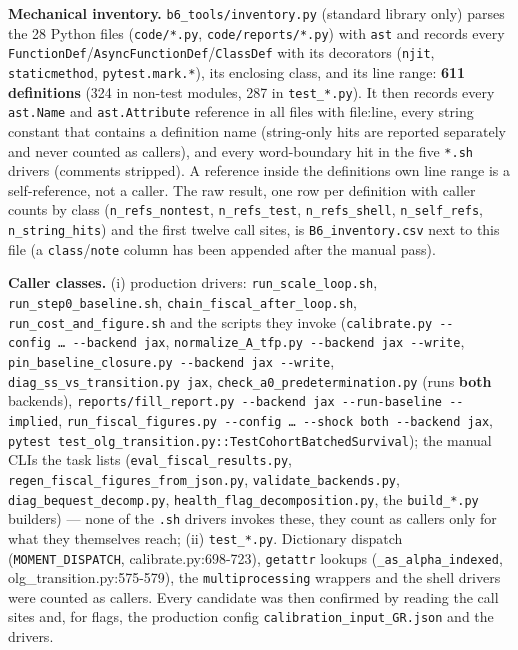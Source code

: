 

\textbf{Mechanical inventory.} \texttt{b6\_tools/inventory.py} (standard
library only) parses the 28 Python files (\texttt{code/*.py},
\texttt{code/reports/*.py}) with \texttt{ast} and records every
\texttt{FunctionDef}/\texttt{AsyncFunctionDef}/\texttt{ClassDef} with
its decorators (\texttt{njit}, \texttt{staticmethod},
\texttt{pytest.mark.*}), its enclosing class, and its line range:
\textbf{611 definitions} (324 in non-test modules, 287 in
\texttt{test\_*.py}). It then records every \texttt{ast.Name} and
\texttt{ast.Attribute} reference in all files with file:line, every
string constant that contains a definition name (string-only hits are
reported separately and never counted as callers), and every
word-boundary hit in the five \texttt{*.sh} drivers (comments stripped).
A reference inside the definition\textquotesingle s own line range is a
self-reference, not a caller. The raw result, one row per definition
with caller counts by class (\texttt{n\_refs\_nontest},
\texttt{n\_refs\_test}, \texttt{n\_refs\_shell}, \texttt{n\_self\_refs},
\texttt{n\_string\_hits}) and the first twelve call sites, is
\texttt{B6\_inventory.csv} next to this file (a
\texttt{class}/\texttt{note} column has been appended after the manual
pass).

\textbf{Caller classes.} (i) production drivers:
\texttt{run\_scale\_loop.sh}, \texttt{run\_step0\_baseline.sh},
\texttt{chain\_fiscal\_after\_loop.sh},
\texttt{run\_cost\_and\_figure.sh} and the scripts they invoke
(\texttt{calibrate.py\ -\/-config\ …\ -\/-backend\ jax},
\texttt{normalize\_A\_tfp.py\ -\/-backend\ jax\ -\/-write},
\texttt{pin\_baseline\_closure.py\ -\/-backend\ jax\ -\/-write},
\texttt{diag\_ss\_vs\_transition.py\ jax},
\texttt{check\_a0\_predetermination.py} (runs \textbf{both} backends),
\texttt{reports/fill\_report.py\ -\/-backend\ jax\ -\/-run-baseline\ -\/-implied},
\texttt{run\_fiscal\_figures.py\ -\/-config\ …\ -\/-shock\ both\ -\/-backend\ jax},
\texttt{pytest\ test\_olg\_transition.py::TestCohortBatchedSurvival});
the manual CLIs the task lists (\texttt{eval\_fiscal\_results.py},
\texttt{regen\_fiscal\_figures\_from\_json.py},
\texttt{validate\_backends.py}, \texttt{diag\_bequest\_decomp.py},
\texttt{health\_flag\_decomposition.py}, the \texttt{build\_*.py}
builders) --- none of the \texttt{.sh} drivers invokes these, they count
as callers only for what they themselves reach; (ii)
\texttt{test\_*.py}. Dictionary dispatch (\texttt{MOMENT\_DISPATCH},
calibrate.py:698-723), \texttt{getattr} lookups
(\texttt{\_as\_alpha\_indexed}, olg\_transition.py:575-579), the
\texttt{multiprocessing} wrappers and the shell drivers were counted as
callers. Every candidate was then confirmed by reading the call sites
and, for flags, the production config
\texttt{calibration\_input\_GR.json} and the drivers.

